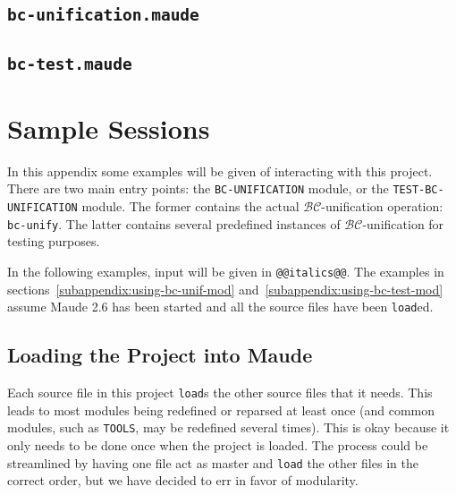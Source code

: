 \documentclass[11pt]{article}
\newcommand{\BC}{\mathcal{BC}}
\begin{document}
\subsection{\lstinline|bc-unification.maude|}
\label{subappendix:bc-unif-mod}

\vspace{2em}

\subsection{\lstinline|bc-test.maude|}
\label{subappendix:test-mod}


\newpage
\section{Sample Sessions}\label{appendix:samples}

In this appendix some examples will be given of interacting with this project.
There are two main entry points: the \lstinline|BC-UNIFICATION| module, or the
\lstinline|TEST-BC-UNIFICATION| module. The former contains the actual
$\BC$-unification operation: \lstinline|bc-unify|. The latter contains several
predefined instances of $\BC$-unification for testing purposes.

In the following examples, input will be given in \lstinline|@@italics@@|. The
examples in sections~\ref{subappendix:using-bc-unif-mod}
and~\ref{subappendix:using-bc-test-mod} assume Maude 2.6 has been started and
all the source files have been \lstinline|load|ed.

\subsection{Loading the Project into Maude}\label{subappendix:loading}

Each source file in this project \lstinline|load|s the other source files that
it needs. This leads to most modules being redefined or reparsed at least once
(and common modules, such as \lstinline|TOOLS|, may be redefined several
times). This is okay because it only needs to be done once when the project is
loaded. The process could be streamlined by having one file act as master and
\lstinline|load| the other files in the correct order, but we have decided to
err in favor of modularity.
\vspace{1ex}


\end{document}
